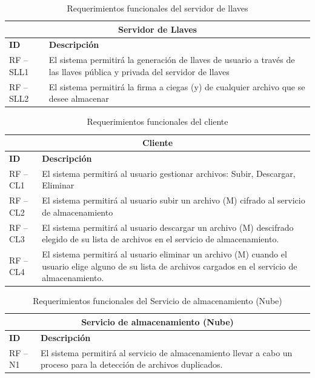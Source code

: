 \begin{table}[htb]
\centering
\begin{tabular}{| p{2cm} | p{13.5cm} |}
\hline
\multicolumn{2}{|c|}{\textbf{Servidor de Llaves}} \\ \hline
\textbf{ID} & \textbf{Descripción} \\
\hline \hline
RF – SLL1 &El sistema permitirá la generación de llaves de usuario a través de las llaves pública y privada del servidor de llaves \\ \hline
RF – SLL2 & El sistema permitirá la firma a ciegas (y) de cualquier archivo que se desee almacenar\\ \hline
\end{tabular}
\caption{Requerimientos funcionales del servidor de llaves}
\label{Servidor de Llaves }
\end{table}


\begin{table}[htb]
\centering
\begin{tabular}{| p{2cm} | p{13.5cm} |}
\hline
\multicolumn{2}{|c|}{\textbf{Cliente}} \\ \hline
\textbf{ID} & \textbf{Descripción} \\
\hline \hline
RF – CL1 & El sistema permitirá al usuario gestionar archivos: Subir, Descargar, Eliminar \\ \hline
RF – CL2 & El sistema permitirá al usuario subir un archivo (M) cifrado al servicio de almacenamiento \\ \hline
RF – CL3 & El sistema permitirá al usuario descargar un archivo (M) descifrado elegido de su lista de archivos en el servicio de almacenamiento. \\ \hline
RF – CL4 &El sistema permitirá al usuario eliminar un archivo (M) cuando el usuario elige alguno de su lista de archivos cargados en el servicio de almacenamiento. \\ \hline
\end{tabular}
\caption{Requerimientos funcionales del cliente}
\label{Cliente }
\end{table}


\begin{table}[htb]
\centering
\begin{tabular}{| p{2cm} | p{13.5cm} |}
\hline
\multicolumn{2}{|c|}{\textbf{Servicio de almacenamiento (Nube)}} \\ \hline
\textbf{ID} & \textbf{Descripción} \\
\hline \hline

RF – N1 & El sistema permitirá al servicio de almacenamiento llevar a cabo un proceso para la detección de archivos duplicados. \\ \hline

\end{tabular}
\caption{Requerimientos funcionales del Servicio de almacenamiento (Nube)}
\label{Servicio de almacenamiento (Nube) }
\end{table}
\vspace{9cm}
